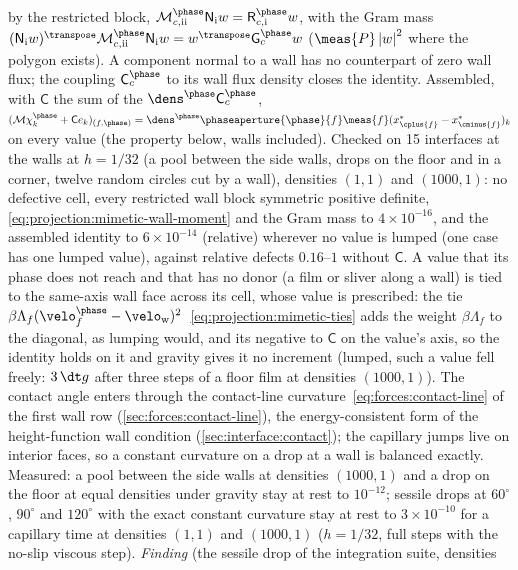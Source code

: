 by the restricted block, $\mathcal M^{\phase}_{c,\mathrm{ii}}\mathsf N_{\mathrm i}w=\mathsf R^{\phase}_{c,\mathrm i}w$,
with the Gram mass $(\mathsf N_{\mathrm i}w)^{\transpose}\mathcal M^{\phase}_{c,\mathrm{ii}}\mathsf N_{\mathrm i}w=w^{\transpose}\mathsf G^{\phase}_cw$
($\meas{P}\abs{w}^2$ where the polygon exists). A component normal to a wall
has no counterpart of zero wall flux; the coupling $\mathsf C^{\phase}_c$ to its
wall flux density closes the identity. Assembled, with $\mathsf C$ the sum of
the $\dens^{\phase}\mathsf C^{\phase}_c$,
$(\mathcal M\chi^{\phase}_k+\mathsf Ce_k)_{(f,\phase)}=\dens^{\phase}\phaseaperture{\phase}{f}\meas{f}(x^{*}_{\cplus{f}}-x^{*}_{\cminus{f}})_k$
on every value (the property below, walls included). Checked on 15 interfaces
at the walls at $h=1/32$ (a pool between the side walls, drops on the floor
and in a corner, twelve random circles cut by a wall), densities $(1,1)$ and
$(1000,1)$: no defective cell, every restricted wall block symmetric positive
definite, \cref{eq:projection:mimetic-wall-moment} and the Gram mass to
$4\times10^{-16}$, and the assembled identity to $6\times10^{-14}$ (relative)
wherever no value is lumped (one case has one lumped value), against relative
defects $0.16$--$1$ without $\mathsf C$. A value that its phase does not
reach and that has no donor (a film or sliver along a wall) is tied to the
same-axis wall face across its cell, whose value is prescribed: the tie
$\beta\Lambda_f(\velo^{\phase}_f-\velo_{\mathrm w})^2$~\cref{eq:projection:mimetic-ties} adds the
weight $\beta\Lambda_f$ to the diagonal, as lumping would, and its negative to
$\mathsf C$ on the value's axis, so the identity holds on it and gravity gives
it no increment (lumped, such a value fell freely: $3\,\dt g$ after three
steps of a floor film at densities $(1000,1)$). The contact angle enters
through the contact-line curvature~\cref{eq:forces:contact-line} of the
first wall row (\cref{sec:forces:contact-line}), the energy-consistent form of the
height-function wall condition (\cref{sec:interface:contact}); the capillary jumps live on interior
faces, so a constant curvature on a drop at a wall is balanced exactly.
Measured: a pool between the side walls at densities $(1000,1)$ and a drop on
the floor at equal densities under gravity stay at rest to $10^{-12}$; sessile
drops at $60^\circ$, $90^\circ$ and $120^\circ$ with the exact constant
curvature stay at rest to $3\times10^{-10}$ for a capillary time at densities
$(1,1)$ and $(1000,1)$ ($h=1/32$, full steps with the no-slip viscous step).
\emph{Finding} (the sessile drop of the integration suite, densities
